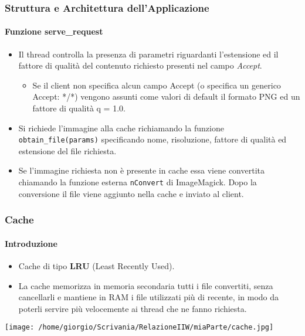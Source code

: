\documentclass{beamer}
\begin{document}
\begin{frame}
\frametitle{Struttura e Architettura dell'Applicazione}
\framesubtitle{Funzione serve\_request}


\begin{itemize}
\item Il thread controlla la presenza di parametri riguardanti l’estensione ed il
fattore di qualità del contenuto richiesto presenti nel campo \textit{Accept}.
\begin{itemize}
\item Se il client non specifica alcun campo
Accept (o specifica un generico Accept: */*) vengono assunti come
valori di default il formato PNG ed un fattore di qualità q = 1.0.
\end{itemize}
\item Si richiede l'immagine alla cache
richiamando la funzione \texttt{obtain\_file(params)} specificando nome,
risoluzione, fattore di qualità ed estensione del file richiesta.
\item Se l’immagine richiesta non è presente in cache essa viene convertita
chiamando la funzione esterna \texttt{nConvert} di ImageMagick. Dopo la conversione il file viene
aggiunto nella cache e inviato al client.
\end{itemize}

\end{frame}










\begin{frame}
\frametitle{Cache}
\framesubtitle{Introduzione}

\begin{itemize}
\item Cache di tipo \textbf{LRU} (Least Recently Used).
\item La cache memorizza in memoria secondaria tutti i file
convertiti, senza cancellarli e mantiene in RAM i file utilizzati più di recente, in
modo da poterli servire più velocemente ai thread che ne fanno richiesta.
\end{itemize}



\texttt{[image: /home/giorgio/Scrivania/RelazioneIIW/miaParte/cache.jpg]}

\end{frame}
\end{document}
